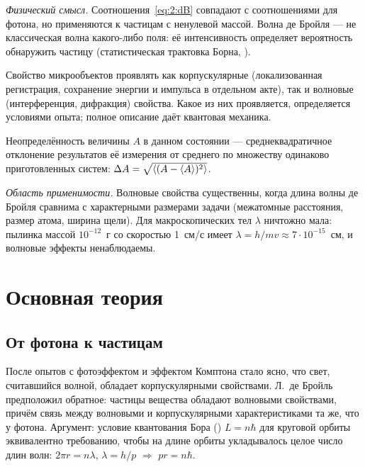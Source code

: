 \emph{Физический смысл.} Соотношения~\eqref{eq:2:dB} совпадают с соотношениями для фотона, но
применяются к частицам с ненулевой массой. Волна де Бройля — не классическая волна какого-либо
поля: её интенсивность определяет вероятность обнаружить частицу (статистическая трактовка
Борна, ).

\begin{definition}
Свойство микрообъектов проявлять как корпускулярные (локализованная регистрация, сохранение
энергии и импульса в отдельном акте), так и волновые (интерференция, дифракция) свойства.
Какое из них проявляется, определяется условиями опыта; полное описание даёт квантовая механика.
\end{definition}

\begin{definition}[неопределённость]
Неопределённость величины $A$ в данном состоянии — среднеквадратичное отклонение результатов
её измерения от среднего по множеству одинаково приготовленных систем:
$\Delta A=\sqrt{\langle(A-\langle A\rangle)^2\rangle}$.
\end{definition}

\emph{Область применимости.} Волновые свойства существенны, когда длина волны де Бройля сравнима
с характерными размерами задачи (межатомные расстояния, размер атома, ширина щели). Для
макроскопических тел $\lambda$ ничтожно мала: пылинка массой $10^{-12}$~г со скоростью 1~см/с
имеет $\lambda=h/mv\approx7\cdot10^{-15}$~см, и волновые эффекты ненаблюдаемы.

\section{Основная теория}

\subsection{От фотона к частицам}

После опытов с фотоэффектом и эффектом Комптона стало ясно, что свет, считавшийся волной,
обладает корпускулярными свойствами. Л.~де Бройль предположил обратное: частицы вещества
обладают волновыми свойствами, причём связь между волновыми и корпускулярными характеристиками
та же, что у фотона. Аргумент: условие квантования Бора () $L=n\hbar$ для круговой
орбиты эквивалентно требованию, чтобы на длине орбиты укладывалось целое число длин волн:
$2\pi r=n\lambda$, $\lambda=h/p$ $\Rightarrow$ $pr=n\hbar$.

